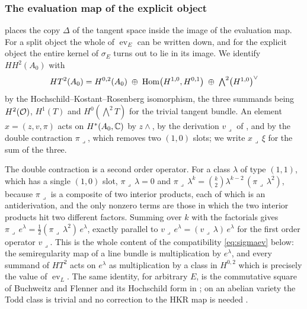 \subsubsection*{The evaluation map of the explicit object}

\cite[Theorem~9.19]{paperI} places the copy $\Delta$ of the tangent space inside the
image of the evaluation map. For a split object the whole of
$\operatorname{ev}_{E}$ can be written down, and for the explicit object the
entire kernel of $\sigma_{E}$ turns out to lie in its image. We identify
$HH^{2}(A_{0})$ with
\begin{equation}\label{eq:HT2}
  HT^{2}(A_{0})
  =H^{0,2}(A_{0})\;\oplus\;\operatorname{Hom}\bigl(H^{1,0},H^{0,1}\bigr)\;\oplus\;
   \textstyle\bigwedge^{2}\bigl(H^{1,0}\bigr)^{\vee}
\end{equation}
by the Hochschild--Kostant--Rosenberg isomorphism, the three summands being
$H^{2}(\mathcal{O})$, $H^{1}(T)$ and $H^{0}(\bigwedge^{2}T)$ for the trivial tangent
bundle. An element $x=(z,v,\pi)$ acts on $H^{*}(A_{0},\mathbb{C})$ by $z\wedge$, by
the derivation $v\lrcorner$ of \cite[Section~9.3]{paperI}, and by the double
contraction $\pi\lrcorner$, which removes two $(1,0)$ slots; we write
$x\lrcorner\,\xi$ for the sum of the three.

The double contraction is a second order operator. For a class $\lambda$ of
type $(1,1)$, which has a single $(1,0)$ slot, $\pi\lrcorner\,\lambda=0$ and
$\pi\lrcorner\,\lambda^{k}=\binom{k}{2}\lambda^{k-2}\,(\pi\lrcorner\,\lambda^{2})$,
because $\pi\lrcorner$ is a composite of two interior products, each of which
is an antiderivation, and the only nonzero terms are those in which the two
interior products hit two different factors. Summing over $k$ with the
factorials gives
$\pi\lrcorner\,e^{\lambda}=\tfrac12(\pi\lrcorner\,\lambda^{2})\,e^{\lambda}$,
exactly parallel to $v\lrcorner\,e^{\lambda}=(v\lrcorner\,\lambda)\,e^{\lambda}$
for the first order operator $v\lrcorner$. This is the whole content of the
compatibility \eqref{eq:sigmaev} below: the semiregularity map of a line
bundle is multiplication by $e^{\lambda}$, and every summand of $HT^{2}$ acts
on $e^{\lambda}$ as multiplication by a class in $H^{0,2}$ which is precisely
the value of $\operatorname{ev}_{L}$. The same identity, for arbitrary $E$, is
the commutative square of Buchweitz and Flenner \cite[Corollary 4.3]{BF03} and
its Hochschild form in \cite[Lemma 11.3]{Mar25b}; on an abelian variety the
Todd class is trivial and no correction to the HKR map is needed
\cite{Cal05,BF08}.


